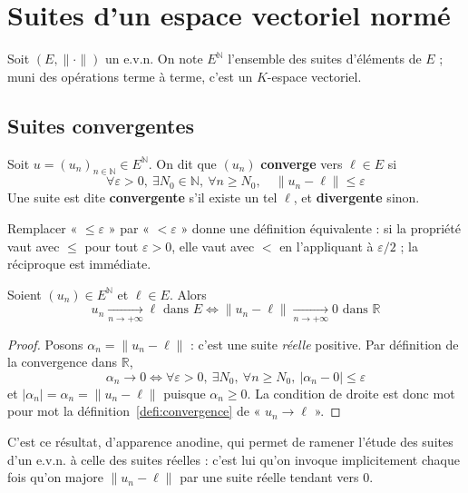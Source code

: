 \section{Suites d'un espace vectoriel normé}

Soit $(E,\|\cdot\|)$ un e.v.n. On note $E^{\mathbb{N}}$ l'ensemble des suites d'éléments de $E$ ; muni des opérations terme à terme, c'est un $K$-espace vectoriel.

\subsection{Suites convergentes}

\begin{defi}[Convergence]
\label{defi:convergence}
Soit $u=(u_n)_{n\in\mathbb{N}}\in E^{\mathbb{N}}$. On dit que $(u_n)$ \textbf{converge} vers $\ell\in E$ si
\[\forall\varepsilon>0,\ \exists N_0\in\mathbb{N},\ \forall n\geq N_0,\quad \|u_n-\ell\|\leq\varepsilon\]
Une suite est dite \textbf{convergente} s'il existe un tel $\ell$, et \textbf{divergente} sinon.
\end{defi}

\begin{remarque}
Remplacer « $\leq\varepsilon$ » par « $<\varepsilon$ » donne une définition équivalente : si la propriété vaut avec $\leq$ pour tout $\varepsilon>0$, elle vaut avec $<$ en l'appliquant à $\varepsilon/2$ ; la réciproque est immédiate.
\end{remarque}

\begin{prop}
\label{prop:norme-suite-reelle}
Soient $(u_n)\in E^{\mathbb{N}}$ et $\ell\in E$. Alors
\[u_n\xrightarrow[n\to+\infty]{}\ell \text{ dans } E \iff \|u_n-\ell\|\xrightarrow[n\to+\infty]{}0 \text{ dans } \mathbb{R}\]
\end{prop}

\begin{proof}
Posons $\alpha_n=\|u_n-\ell\|$ : c'est une suite \emph{réelle} positive. Par définition de la convergence dans $\mathbb{R}$,
\[\alpha_n\to 0 \iff \forall\varepsilon>0,\ \exists N_0,\ \forall n\geq N_0,\ |\alpha_n-0|\leq\varepsilon\]
et $|\alpha_n|=\alpha_n=\|u_n-\ell\|$ puisque $\alpha_n\geq 0$. La condition de droite est donc mot pour mot la définition~\ref{defi:convergence} de « $u_n\to\ell$ ».
\end{proof}

C'est ce résultat, d'apparence anodine, qui permet de ramener l'étude des suites d'un e.v.n. à celle des suites réelles : c'est lui qu'on invoque implicitement chaque fois qu'on majore $\|u_n-\ell\|$ par une suite réelle tendant vers $0$.

